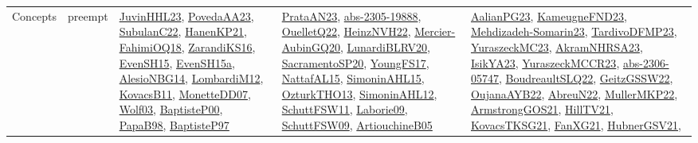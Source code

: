 {\begin{longtable}{llp{6cm}p{6cm}p{6cm}}
Concepts & preempt & \href{papers/JuvinHHL23.pdf}{JuvinHHL23}\cite{JuvinHHL23}, \href{papers/PovedaAA23.pdf}{PovedaAA23}\cite{PovedaAA23}, \href{articles/SubulanC22.pdf}{SubulanC22}\cite{SubulanC22}, \href{papers/HanenKP21.pdf}{HanenKP21}\cite{HanenKP21}, \href{articles/FahimiOQ18.pdf}{FahimiOQ18}\cite{FahimiOQ18}, \href{articles/ZarandiKS16.pdf}{ZarandiKS16}\cite{ZarandiKS16}, \href{papers/EvenSH15.pdf}{EvenSH15}\cite{EvenSH15}, \href{articles/EvenSH15a.pdf}{EvenSH15a}\cite{EvenSH15a}, \href{papers/AlesioNBG14.pdf}{AlesioNBG14}\cite{AlesioNBG14}, \href{articles/LombardiM12.pdf}{LombardiM12}\cite{LombardiM12}, \href{articles/KovacsB11.pdf}{KovacsB11}\cite{KovacsB11}, \href{papers/MonetteDD07.pdf}{MonetteDD07}\cite{MonetteDD07}, \href{papers/Wolf03.pdf}{Wolf03}\cite{Wolf03}, \href{articles/BaptisteP00.pdf}{BaptisteP00}\cite{BaptisteP00}, \href{articles/PapaB98.pdf}{PapaB98}\cite{PapaB98}, \href{papers/BaptisteP97.pdf}{BaptisteP97}\cite{BaptisteP97} & \href{articles/PrataAN23.pdf}{PrataAN23}\cite{PrataAN23}, \href{articles/abs-2305-19888.pdf}{abs-2305-19888}\cite{abs-2305-19888}, \href{papers/OuelletQ22.pdf}{OuelletQ22}\cite{OuelletQ22}, \href{articles/HeinzNVH22.pdf}{HeinzNVH22}\cite{HeinzNVH22}, \href{papers/Mercier-AubinGQ20.pdf}{Mercier-AubinGQ20}\cite{Mercier-AubinGQ20}, \href{articles/LunardiBLRV20.pdf}{LunardiBLRV20}\cite{LunardiBLRV20}, \href{articles/SacramentoSP20.pdf}{SacramentoSP20}\cite{SacramentoSP20}, \href{papers/YoungFS17.pdf}{YoungFS17}\cite{YoungFS17}, \href{articles/NattafAL15.pdf}{NattafAL15}\cite{NattafAL15}, \href{articles/SimoninAHL15.pdf}{SimoninAHL15}\cite{SimoninAHL15}, \href{articles/OzturkTHO13.pdf}{OzturkTHO13}\cite{OzturkTHO13}, \href{papers/SimoninAHL12.pdf}{SimoninAHL12}\cite{SimoninAHL12}, \href{articles/SchuttFSW11.pdf}{SchuttFSW11}\cite{SchuttFSW11}, \href{papers/Laborie09.pdf}{Laborie09}\cite{Laborie09}, \href{papers/SchuttFSW09.pdf}{SchuttFSW09}\cite{SchuttFSW09}, \href{papers/ArtiouchineB05.pdf}{ArtiouchineB05}\cite{ArtiouchineB05} & \href{papers/AalianPG23.pdf}{AalianPG23}\cite{AalianPG23}, \href{papers/KameugneFND23.pdf}{KameugneFND23}\cite{KameugneFND23}, \href{papers/Mehdizadeh-Somarin23.pdf}{Mehdizadeh-Somarin23}\cite{Mehdizadeh-Somarin23}, \href{papers/TardivoDFMP23.pdf}{TardivoDFMP23}\cite{TardivoDFMP23}, \href{papers/YuraszeckMC23.pdf}{YuraszeckMC23}\cite{YuraszeckMC23}, \href{articles/AkramNHRSA23.pdf}{AkramNHRSA23}\cite{AkramNHRSA23}, \href{articles/IsikYA23.pdf}{IsikYA23}\cite{IsikYA23}, \href{articles/YuraszeckMCCR23.pdf}{YuraszeckMCCR23}\cite{YuraszeckMCCR23}, \href{articles/abs-2306-05747.pdf}{abs-2306-05747}\cite{abs-2306-05747}, \href{papers/BoudreaultSLQ22.pdf}{BoudreaultSLQ22}\cite{BoudreaultSLQ22}, \href{papers/GeitzGSSW22.pdf}{GeitzGSSW22}\cite{GeitzGSSW22}, \href{papers/OujanaAYB22.pdf}{OujanaAYB22}\cite{OujanaAYB22}, \href{articles/AbreuN22.pdf}{AbreuN22}\cite{AbreuN22}, \href{articles/MullerMKP22.pdf}{MullerMKP22}\cite{MullerMKP22}, \href{papers/ArmstrongGOS21.pdf}{ArmstrongGOS21}\cite{ArmstrongGOS21}, \href{papers/HillTV21.pdf}{HillTV21}\cite{HillTV21}, \href{papers/KovacsTKSG21.pdf}{KovacsTKSG21}\cite{KovacsTKSG21}, \href{articles/FanXG21.pdf}{FanXG21}\cite{FanXG21}, \href{articles/HubnerGSV21.pdf}{HubnerGSV21}\cite{HubnerGSV21}, 
\end{longtable}}
